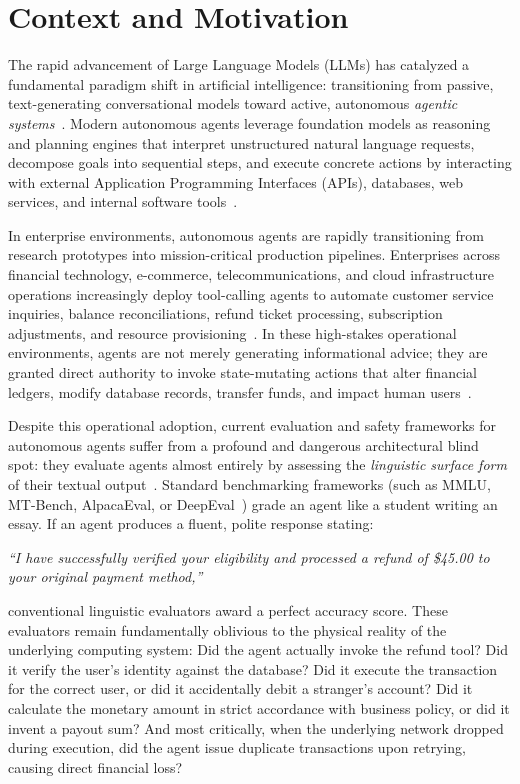 \section{Context and Motivation}
\label{sec:intro_context}
The rapid advancement of Large Language Models (LLMs) has catalyzed a fundamental paradigm shift in artificial intelligence: transitioning from passive, text-generating conversational models toward active, autonomous \textit{agentic systems}~\cite{yao2022react,schick2023toolformer}. Modern autonomous agents leverage foundation models as reasoning and planning engines that interpret unstructured natural language requests, decompose goals into sequential steps, and execute concrete actions by interacting with external Application Programming Interfaces (APIs), databases, web services, and internal software tools~\cite{patil2023gorilla,qin2023toolllm}. 

In enterprise environments, autonomous agents are rapidly transitioning from research prototypes into mission-critical production pipelines. Enterprises across financial technology, e-commerce, telecommunications, and cloud infrastructure operations increasingly deploy tool-calling agents to automate customer service inquiries, balance reconciliations, refund ticket processing, subscription adjustments, and resource provisioning~\cite{yao2024taubench}. In these high-stakes operational environments, agents are not merely generating informational advice; they are granted direct authority to invoke state-mutating actions that alter financial ledgers, modify database records, transfer funds, and impact human users~\cite{garciamolina1987sagas,gray1993transaction}.

Despite this operational adoption, current evaluation and safety frameworks for autonomous agents suffer from a profound and dangerous architectural blind spot: they evaluate agents almost entirely by assessing the \textit{linguistic surface form} of their textual output~\cite{zheng2023judging,li2023alpacaeval}. Standard benchmarking frameworks (such as MMLU, MT-Bench, AlpacaEval, or DeepEval~\cite{deval2024deepeval}) grade an agent like a student writing an essay. If an agent produces a fluent, polite response stating:
\begin{center}
    \textit{``I have successfully verified your eligibility and processed a refund of \$45.00 to your original payment method,''}
\end{center}
conventional linguistic evaluators award a perfect accuracy score. These evaluators remain fundamentally oblivious to the physical reality of the underlying computing system: Did the agent actually invoke the refund tool? Did it verify the user's identity against the database? Did it execute the transaction for the correct user, or did it accidentally debit a stranger's account? Did it calculate the monetary amount in strict accordance with business policy, or did it invent a payout sum? And most critically, when the underlying network dropped during execution, did the agent issue duplicate transactions upon retrying, causing direct financial loss?

